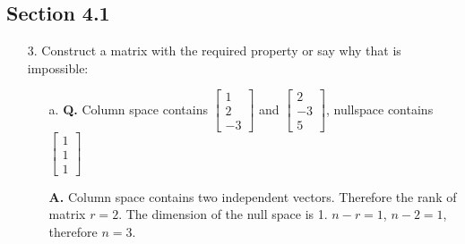 \documentclass[main.tex]{subfiles}
\begin{document}
\subsection{Section 4.1}
\begin{enumerate}
    \item [3.] Construct a matrix with the required property or say why that is impossible:
    \begin{enumerate}
        \item [a.] \textbf{Q.} Column space contains $\left[\begin{array}{c}1 \\ 2 \\ -3\end{array}\right]$ and $\left[\begin{array}{c}2 \\ -3 \\ 5\end{array}\right]$, nullspace contains $\left[\begin{array}{l}1 \\ 1 \\ 1\end{array}\right]$ 
        
        \textbf{A.} Column space contains two independent vectors. Therefore the rank of matrix $r = 2$. The dimension of the null space is 1. $n-r=1$, $n-2=1$, therefore $n=3$.
        

\end{enumerate}
\end{enumerate}
\end{document}
